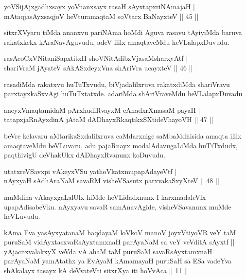 
\begin{shl}
yoVSijAjxgadhxsayx yoVnanxsayx rasaH sAyxtapxriNAmajaH |\\
mAtaqjasAyxsaqjoV heVturamaqtaM soV\s tarx BaNayxteV \hfill || 45 ||
\end{shl}

\begin{artha}
sitxrXVyaru tiMda ananxvu pariNAma hoMdi Aguva rasavu tAyiyiMda baruva rakatxkekx kAraNavAguvudu, adeV ililx amaqtaveMdu heVLalapxDuvudu.
\end{artha}

\begin{shl}
rasAcoCxVNitaniSapxtitxH shoVNitAdibxVjasaMsharxyAtf |\\
shariVraM jAyateV sAkASxdeyxVna shAriVra ucayxteV \hfill || 46 ||
\end{shl}

\begin{artha}
rasadiMda rakatxvu huTuTxvudu, biVjadalilxruva rakatxdiMda shariVravu parxtayxkaSxvAgi huTuTxtatxde. adariMda shAriVraveMdu heVLalapxDuvadu 
\end{artha}

\begin{shl}
aneyxV\s maqtamidaM pArxhudiRvayxM cAnadxrXmasaM payaH |\\
tatapxjaRnAyxdinA jAtaM dADhayxRkaqtikxSXtideVhayoVH \hfill || 47 ||
\end{shl}

\begin{artha}%
beVre kelavaru aMtarikaSxdalilxruva caMdarxnige saMbaMdhisida amaqta ililx amaqtaveMdu heVLuvaru, adu pajaRnayx modalAdavugaLiMda huTiTxdudx, paqthivigU deVhakUkx dADhayxRvanunx koDuvudu.
\end{artha}

\begin{shl}
utatxreVSavxpi vAkeyxVSu yathoVkatxmupapAdayeVtf |\\
nAyxyaH sAdhAraNaM savaRM visheVSasutx parxvakaSxyXteV \hfill || 48 ||
\end{shl}

\begin{artha}
muMdina vAkayxgaLalUlx hiMde heVLidadxnunx I karxmadaleVlx upapAdisabeVku. nAyxyavu savaR samAnavAgide, visheVSavanunx muMde heVLuvudu.
\end{artha}


\begin{kandikeshl}
kAma Eva yasAyxyatanaM haqdayaM loVkoV manoV joyxVtiyoVR veY taM puruSaM vidAyxtasxvaRsAyxtamxnaH parAyaNaM sa veY veVditA sAyxtf || yAjacnxvalakxyX veVda vA ahaM taM puruSaM savaRsAyxtamxnaH parAyaNaM yamAtathx ya EvAyaM kAmamayaH puruSaH sa ESa vadeYva shAkalayx tasayx kA deVvateVti sitxrXya iti hoVvAca || 11 ||
\end{kandikeshl}

